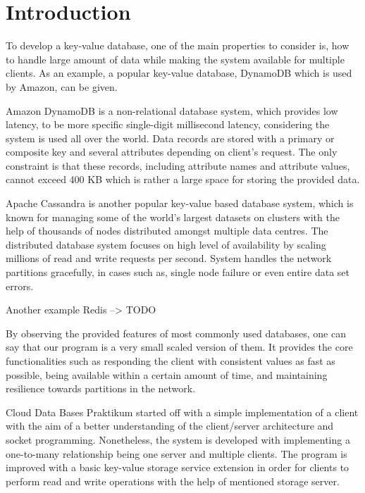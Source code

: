 \section{Introduction}
\label{sec:introduction}

To develop a key-value database, one of the main properties to consider is, how to handle large amount of data while making the system available for multiple clients. As an example, a popular key-value database, DynamoDB which is used by Amazon, can be given. 

Amazon DynamoDB is a non-relational database system, which provides low latency, to be more specific single-digit millisecond latency\cite{amazon}, considering the system is used all over the world. Data records are stored with a primary or composite key and several attributes depending on client's request. The only constraint is that these records, including attribute names and attribute values, cannot exceed 400 KB which is rather a large space for storing the provided data\cite{amazon}.

Apache Cassandra is another popular key-value based database system, which is known for managing some of the world's largest datasets on clusters with the help of thousands of nodes distributed amongst multiple data centres. The distributed database system focuses on high level of availability by scaling millions of read and write requests per second. System handles the network partitions gracefully, in cases such as, single node failure or even entire data set errors\cite{chebotko2015big}.

Another example Redis --> TODO \cite{paksula2010persisting}

By observing the provided features of most commonly used databases, one can say that our program is a very small scaled version of them. It provides the core functionalities such as responding the client with consistent values as fast as possible, being available within a certain amount of time, and maintaining resilience towards partitions in the network.

Cloud Data Bases Praktikum started off with a simple implementation of a client with the aim of a better understanding of the client/server architecture and socket programming. Nonetheless, the system is developed with implementing a one-to-many relationship being one server and multiple clients. The program is improved with a basic key-value storage service extension in order for clients to perform read and write operations with the help of mentioned storage server. 

